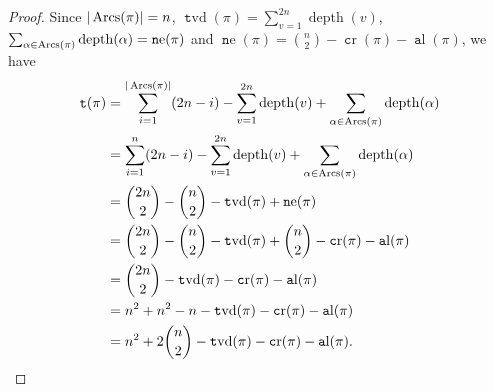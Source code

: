 \documentclass[10pt,a4paper]{amsart}
\DeclareMathOperator{\al}{\mathtt al}
\DeclareMathOperator{\arcs}{\text Arcs}
\DeclareMathOperator{\cro}{\mathtt cr}
\DeclareMathOperator{\depth}{depth}
\DeclareMathOperator{\dindex}{\mathtt t}
\DeclareMathOperator{\nst}{\mathtt ne}
\DeclareMathOperator{\tvd}{\mathtt tvd}
\begin{document}
\begin{proof} Since $|\arcs(\pi)|=n$, $\tvd(\pi)=\sum_{v=1}^{2n} \depth(v)$, $\sum_{\alpha \in \arcs(\pi)} \depth(\alpha)=\nst(\pi)$ and $\nst(\pi)=\binom{n}{2}-\cro(\pi)-\al(\pi)$, we have
\begin{align*}  
\dindex(\pi)&=\sum_{i=1}^{|\arcs(\pi)|}(2n-i)-\sum_{v=1}^{2n} \depth(v) + \sum_{\alpha \in \arcs(\pi)} \depth(\alpha) \\
&=\sum_{i=1}^{n}(2n-i)-\sum_{v=1}^{2n} \depth(v) + \sum_{\alpha \in \arcs(\pi)} \depth(\alpha) \\
&=\binom{2n}{2}-\binom{n}{2}-\tvd(\pi)+\nst(\pi) \\
&=\binom{2n}{2}-\binom{n}{2}-\tvd(\pi)+\binom{n}{2}-\cro(\pi)-\al(\pi) \\
&=\binom{2n}{2}-\tvd(\pi)-\cro(\pi)-\al(\pi) \\
&=n^2+n^2-n-\tvd(\pi)-\cro(\pi)-\al(\pi) \\
&= n^2 + 2\binom{n}{2} - \tvd(\pi) - \cro(\pi) - \al(\pi).
\end{align*}
\end{proof}
\end{document}
